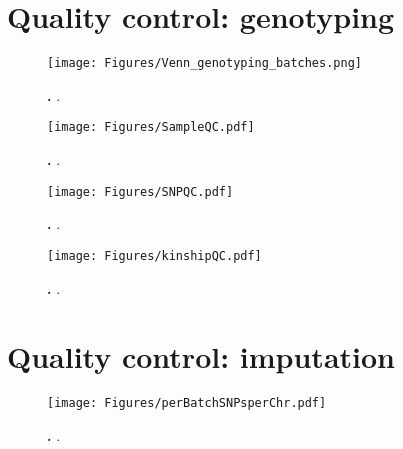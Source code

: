 \section{Quality control: genotyping}

\begin{figure}[hbtp]
	\centering
	\texttt{[image: Figures/Venn\_genotyping\_batches.png]}
	\caption{\textbf{.} .}
 	\label{fig:probeoverlap}
\end{figure}

\begin{figure}[hbtp]
	\centering
	\texttt{[image: Figures/SampleQC.pdf]}
	\caption{\textbf{.} .}
 	\label{fig:sampleQC}
\end{figure}

\begin{figure}[hbtp]
	\centering
	\texttt{[image: Figures/SNPQC.pdf]}
	\caption{\textbf{.} .}
 	\label{fig:SNPQC}
\end{figure}

\begin{figure}[hbtp]
	\centering
	\texttt{[image: Figures/kinshipQC.pdf]}
	\caption{\textbf{.} .}
 	\label{fig:kinshipQC}
\end{figure}

\section{Quality control: imputation}

\begin{figure}[hbtp]
	\centering
	\texttt{[image: Figures/perBatchSNPsperChr.pdf]}
	\caption{\textbf{.} .}
 	\label{fig:imputeQC}
\end{figure}